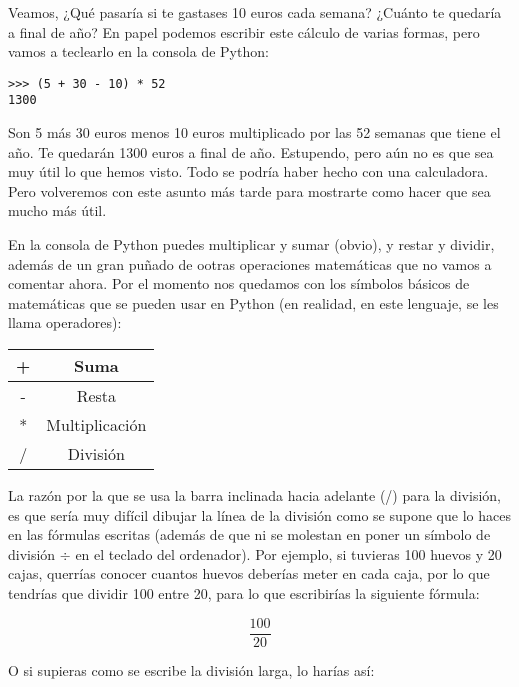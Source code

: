 Veamos, ¿Qué pasaría si te gastases 10 euros cada semana? ¿Cuánto te quedaría a final de año? En papel podemos escribir este cálculo de varias formas, pero vamos a teclearlo en la consola de Python: 

\begin{listing}
\begin{verbatim}
>>> (5 + 30 - 10) * 52
1300
\end{verbatim}
\end{listing}

Son 5 más 30 euros menos 10 euros multiplicado por las 52 semanas que tiene el año. Te quedarán 1300 euros a final de año. Estupendo, pero aún no es que sea muy útil lo que hemos visto. Todo se podría haber hecho con una calculadora. Pero volveremos con este asunto más tarde para mostrarte como hacer que sea mucho más útil.  

En la consola de Python puedes multiplicar y sumar (obvio), y restar y dividir, además de un gran puñado de ootras operaciones matemáticas que no vamos a comentar ahora. Por el momento nos quedamos con los símbolos básicos de matemáticas que se pueden usar en Python (en realidad, en este lenguaje, se les llama operadores):

\begin{center}
\begin{tabular}{|c|c|}
\hline
+ & Suma \\
\hline
- & Resta \\
\hline
* & Multiplicación \\
\hline
/ & División \\
\hline
\end{tabular}
\end{center}

La razón por la que se usa la barra inclinada hacia adelante (/) para la división, es que sería muy difícil dibujar la línea de la división como se supone que lo haces en las fórmulas escritas (además de que ni se molestan en poner un símbolo de división $\div$ en el teclado del ordenador). Por ejemplo, si tuvieras 100 huevos y 20 cajas, querrías conocer cuantos huevos deberías meter en cada caja, por lo que tendrías que dividir 100 entre 20, para lo que escribirías la siguiente fórmula:

\begin{displaymath}
\frac{100}{20}
\end{displaymath}

O si supieras como se escribe la división larga, lo harías así:

